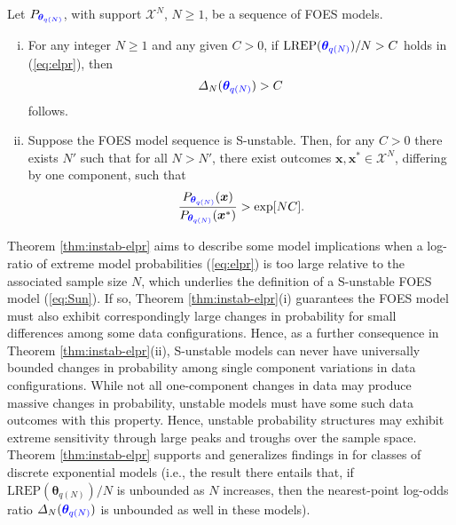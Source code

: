 \documentclass[numbib]{imamat}
\theoremstyle{theorem}
\theoremstyle{lemma}
\theoremstyle{example}
\theoremstyle{corollary}
\theoremstyle{definition}
\theoremstyle{remark}
\theoremstyle{approximation}
\theoremstyle{scheme}
\newcommand{\REP}{\mathrm{LREP}}
\newcommand{\DN}{\Delta_N}
\newcommand{\thetaidx}{q(N)}
\newcommand{\thetaN}{\boldsymbol \theta_{\thetaidx}}
\newcommand{\ak}[1]{{\color{blue} #1}}
\let\BeginKnitrBlock\begin \let\EndKnitrBlock\end
\begin{document}
\BeginKnitrBlock{theorem}
\protect\hypertarget{thm:instab-elpr}{}{\label{thm:instab-elpr} }Let \(P_{\ak{\thetaN}}\), with support \(\mathcal{X}^N\), \(N\geq 1\), be a sequence of FOES models.
\begin{enumerate}[(i)]
\item For any integer $N \geq 1$ and any given $C>0$, if $\REP(\ak{\thetaN})/N > C$ holds in (\ref{eq:elpr}), then
    $$ \DN(\ak{\thetaN}) > C$$
    follows.
\item Suppose the FOES model sequence is S-unstable. Then, \ak{for any $C>0$ there exists $N'$ such that for all $N>N'$}, there exist outcomes $\boldsymbol x,\boldsymbol x^*\in\mathcal{X}^N$, differing by one component, such that
    $$
    \frac{P_{\ak{\thetaN}}(\boldsymbol x)}{P_{\ak{\thetaN}}(\boldsymbol x^*)} > \exp[N C].
    $$
\end{enumerate}
\EndKnitrBlock{theorem}

\ak{Theorem \ref{thm:instab-elpr} aims to describe some model implications when a log-ratio of extreme model probabilities (\ref{eq:elpr}) is too large relative to the associated sample size $N$, which underlies the definition of a S-unstable FOES model (\ref{eq:Sun}). If so, Theorem \ref{thm:instab-elpr}(i) guarantees the FOES model must also exhibit correspondingly large changes in probability for small differences among some data configurations. Hence, as a further consequence in Theorem \ref{thm:instab-elpr}(ii), S-unstable models can never have universally bounded changes in probability among single component variations in data configurations. While not all one-component changes in data may produce massive changes in probability, unstable models must have some such data outcomes with this property. Hence,
unstable probability structures may exhibit extreme sensitivity through large peaks and troughs over the sample space.  Theorem \ref{thm:instab-elpr} supports and generalizes findings in \citet[Theorem 1]{schweinberger2011instability} for classes of discrete exponential models (i.e., the result there entails that, if $\REP(\thetaN)/N $ is unbounded as $N$ increases, then the nearest-point log-odds ratio  $\DN(\ak{\thetaN})$  is unbounded as well in these models).}
\end{document}
